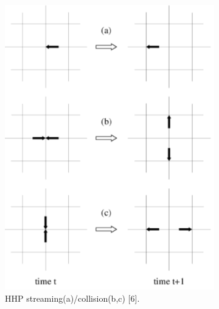 \begin{figure}[H]
  \centering
  \begin{subfigure}[h]{0.5\textwidth}
    \includegraphics[width=\textwidth]{img/fig4.png}
    \caption{HHP streaming(a)/collision(b,c) [6].}
  \end{subfigure}
  \begin{subfigure}[h]{0.3\textwidth}

\end{subfigure}
\end{figure}
